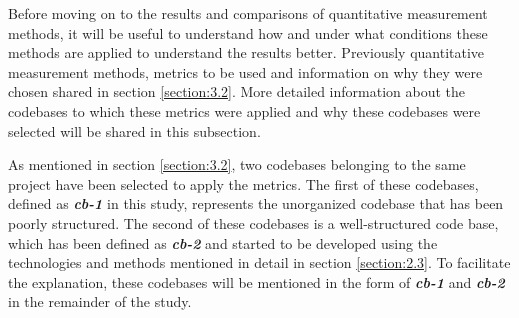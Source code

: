 Before moving on to the results and comparisons of quantitative measurement methods, it will be useful to understand how and under what conditions these methods are applied to understand the results better. Previously quantitative measurement methods, metrics to be used and information on why they were chosen shared in section \ref{section:3.2}. More detailed information about the codebases to which these metrics were applied and why these codebases were selected will be shared in this subsection.

As mentioned in section \ref{section:3.2}, two codebases belonging to the same project have been selected to apply the metrics. The first of these codebases, defined as \textbf{\textit{cb-1}} in this study, represents the unorganized codebase that has been poorly structured. The second of these codebases is a well-structured code base, which has been defined as \textbf{\textit{cb-2}} and started to be developed using the technologies and methods mentioned in detail in section \ref{section:2.3}. To facilitate the explanation, these codebases will be mentioned in the form of \textbf{\textit{cb-1}} and \textbf{\textit{cb-2}} in the remainder of the study.

